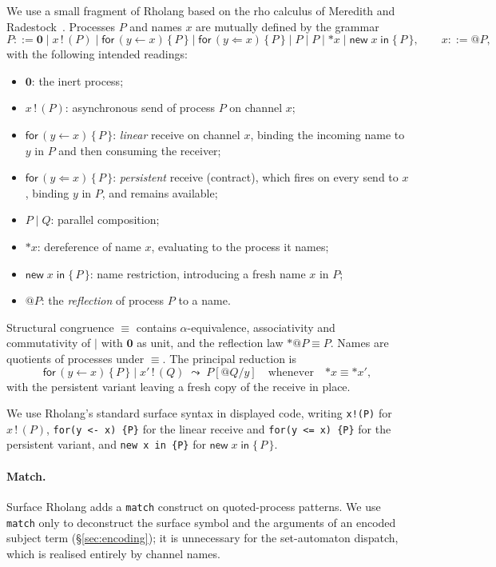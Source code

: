 \documentclass[11pt]{article}
\theoremstyle{plain}
\theoremstyle{definition}
\theoremstyle{remark}
\newcommand{\rew}{\leadsto}
\newcommand{\nil}{\mathbf{0}}
\newcommand{\Send}[2]{#1 \,!\, (#2)}
\newcommand{\Recv}[3]{\mathsf{for}\,(#1 \leftarrow #2)\,\{\,#3\,\}}
\newcommand{\Bang}[3]{\mathsf{for}\,(#1 \Leftarrow #2)\,\{\,#3\,\}}
\newcommand{\New}[2]{\mathsf{new}\;#1\;\mathsf{in}\;\{\,#2\,\}}
\begin{document}
We use a small fragment of Rholang based on the rho calculus of Meredith
and Radestock~\cite{MeredithRadestock2005}. Processes $P$ and names $x$
are mutually defined by the grammar
\[
  P ::= \nil \mid \Send{x}{P} \mid \Recv{y}{x}{P} \mid \Bang{y}{x}{P}
        \mid P \mid P \mid {*x} \mid \New{x}{P},
  \qquad
  x ::= @P,
\]
with the following intended readings:
\begin{itemize}[leftmargin=*]
  \item $\nil$: the inert process;
  \item $\Send{x}{P}$: asynchronous send of process $P$ on channel $x$;
  \item $\Recv{y}{x}{P}$: \emph{linear} receive on channel $x$, binding
        the incoming name to $y$ in $P$ and then consuming the receiver;
  \item $\Bang{y}{x}{P}$: \emph{persistent} receive (\textsf{contract}),
        which fires on every send to $x$, binding $y$ in $P$, and remains
        available;
  \item $P \mid Q$: parallel composition;
  \item $*x$: dereference of name $x$, evaluating to the process it
        names;
  \item $\New{x}{P}$: name restriction, introducing a fresh name $x$ in
        $P$;
  \item $@P$: the \emph{reflection} of process $P$ to a name.
\end{itemize}
Structural congruence $\equiv$ contains $\alpha$-equivalence, associativity
and commutativity of $\mid$ with $\nil$ as unit, and the reflection law
$*@P \equiv P$. Names are quotients of processes under $\equiv$. The
principal reduction is
\[
  \Recv{y}{x}{P} \mid \Send{x'}{Q} \;\rew\; P[@Q / y]
  \quad\text{whenever}\quad {*x} \equiv {*x'},
\]
with the persistent variant leaving a fresh copy of the receive in place.

We use Rholang's standard surface syntax in displayed code, writing
\texttt{x!(P)} for $\Send{x}{P}$, \texttt{for(y <- x) \{P\}} for the linear
receive and \texttt{for(y <= x) \{P\}} for the persistent variant, and
\texttt{new x in \{P\}} for $\New{x}{P}$.

\paragraph{Match.}
Surface Rholang adds a \texttt{match} construct on quoted-process patterns.
We use \texttt{match} only to deconstruct the surface symbol and the
arguments of an encoded subject term (\S\ref{sec:encoding}); it is
unnecessary for the set-automaton dispatch, which is realised entirely by
channel names.
\end{document}
